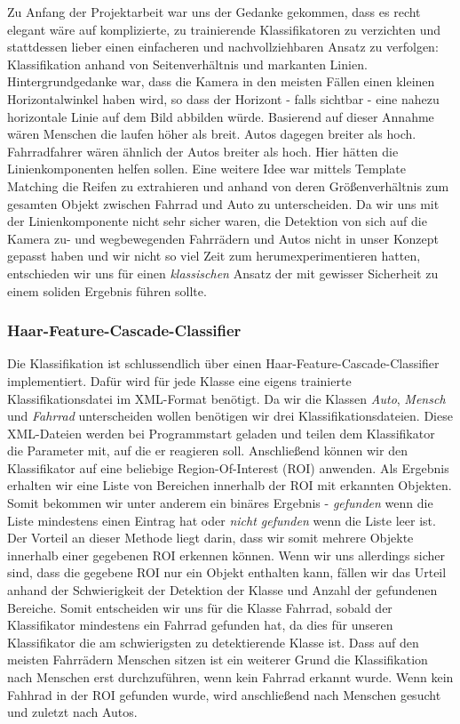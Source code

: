 \documentclass[conference]{IEEEtran}
\begin{document}
Zu Anfang der Projektarbeit war uns der Gedanke gekommen, dass es recht elegant wäre auf komplizierte, zu trainierende Klassifikatoren zu verzichten und stattdessen lieber einen einfacheren und nachvollziehbaren Ansatz zu verfolgen: Klassifikation anhand von Seitenverhältnis und markanten Linien. Hintergrundgedanke war, dass die Kamera in den meisten Fällen einen kleinen Horizontalwinkel haben wird, so dass der Horizont - falls sichtbar - eine nahezu horizontale Linie auf dem Bild abbilden würde. Basierend auf dieser Annahme wären Menschen die laufen höher als breit. Autos dagegen breiter als hoch. Fahrradfahrer wären ähnlich der Autos breiter als hoch. Hier hätten die Linienkomponenten helfen sollen. Eine weitere Idee war mittels Template Matching die Reifen zu extrahieren und anhand von deren Größenverhältnis zum gesamten Objekt zwischen Fahrrad und Auto zu unterscheiden.
Da wir uns mit der Linienkomponente nicht sehr sicher waren, die Detektion von sich auf die Kamera zu- und wegbewegenden Fahrrädern und Autos nicht in unser Konzept gepasst haben und wir nicht so viel Zeit zum herumexperimentieren hatten, entschieden wir uns für einen \textit{klassischen} Ansatz der mit gewisser Sicherheit zu einem soliden Ergebnis führen sollte.

\subsubsection{Haar-Feature-Cascade-Classifier}

Die Klassifikation ist schlussendlich über einen Haar-Feature-Cascade-Classifier implementiert.
Dafür wird für jede Klasse eine eigens trainierte Klassifikationsdatei im XML-Format benötigt. Da wir die Klassen \textit{Auto}, \textit{Mensch} und \textit{Fahrrad} unterscheiden wollen benötigen wir drei Klassifikationsdateien. Diese XML-Dateien werden bei Programmstart geladen und teilen dem Klassifikator die Parameter mit, auf die er reagieren soll. Anschließend können wir den Klassifikator auf eine beliebige Region-Of-Interest (ROI) anwenden. Als Ergebnis erhalten wir eine Liste von Bereichen innerhalb der ROI mit erkannten Objekten. Somit bekommen wir unter anderem ein binäres Ergebnis - \textit{gefunden} wenn die Liste mindestens einen Eintrag hat oder \textit{nicht gefunden} wenn die Liste leer ist. Der Vorteil an dieser Methode liegt darin, dass wir somit mehrere Objekte innerhalb einer gegebenen ROI erkennen können. Wenn wir uns allerdings sicher sind, dass die gegebene ROI nur ein Objekt enthalten kann, fällen wir das Urteil anhand der Schwierigkeit der Detektion der Klasse und Anzahl der gefundenen Bereiche. Somit entscheiden wir uns für die Klasse Fahrrad, sobald der Klassifikator mindestens ein Fahrrad gefunden hat, da dies für unseren Klassifikator die am schwierigsten zu detektierende Klasse ist. Dass auf den meisten Fahrrädern Menschen sitzen ist ein weiterer Grund die Klassifikation nach Menschen erst durchzuführen, wenn kein Fahrrad erkannt wurde.
Wenn kein Fahhrad in der ROI gefunden wurde, wird anschließend nach Menschen gesucht und zuletzt nach Autos.
\end{document}
